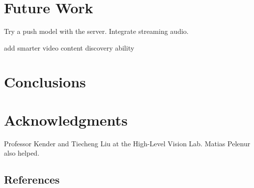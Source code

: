 \documentclass{sig-alternate}
\begin{document}
\section{Future Work} \label{con}

Try a push model with the server.  Integrate streaming audio.

add smarter video content discovery ability

\section{Conclusions}

\section{Acknowledgments}

Professor Kender and Tiecheng Liu at the High-Level Vision Lab.
Matias Pelenur also helped.

%


\subsection{References}


\balancecolumns %
\end{document}
